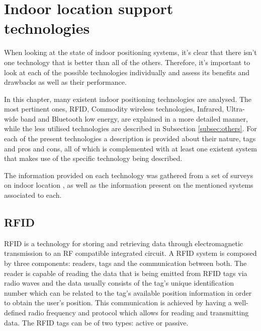\section{Indoor location support technologies}  
\label{sec:indoortech}  
  
  
When looking at the state of indoor positioning systems, it's clear that there isn't one technology that is better than all of the others. Therefore, it's important to look at each of the possible technologies individually and assess its benefits and drawbacks as well as their performance\cite{survey1}.  
  
  
In this chapter, many existent indoor positioning technologies are analysed. The most pertinent ones, \acf{RFID}, Commodity wireless technologies, Infrared, Ultra-wide band and Bluetooth low energy, are explained in a more detailed manner, while the less utilised technologies are described in Subsection \ref{subsec:others}. For each of the present technologies a description is provided about their nature, tags and pros and cons, all of which is complemented with at least one existent system that makes use of the specific technology being described.   
  
  
The information provided on each technology was gathered from a set of surveys on indoor location \cite{surveythesis,survey2,survey1}, as well as the information present on the mentioned systems associated to each.  
  
  
\subsection{RFID}  
\label{subsec:rfid}  
  
  
\ac{RFID} is a technology for storing and retrieving data through electromagnetic transmission to an RF compatible integrated circuit. A \ac{RFID} system is composed by three components: readers, tags and the communication between both. The reader is capable of reading the data that is being emitted from \ac{RFID} tags via radio waves and the data usually consists of the tag's unique identification number which can be related to the tag's available position information in order to obtain the user's position. This communication is achieved by having a well-defined radio frequency and protocol which allows for reading and transmitting data. The \ac{RFID} tags can be of two types: active or passive.  
  

